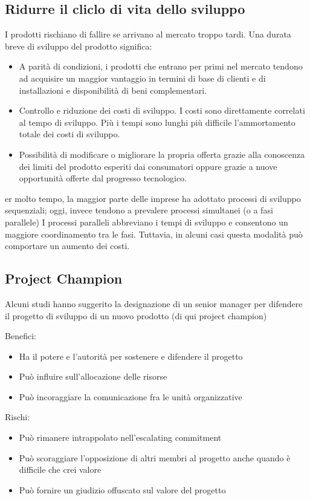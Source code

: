 \documentclass{article}
\begin{document}
\subsection{Ridurre il cliclo di vita dello sviluppo }
I prodotti rischiano di fallire se arrivano al mercato troppo tardi.
Una durata breve di sviluppo del prodotto significa:
\begin{itemize}
	\item A parità di condizioni, i prodotti che entrano per primi nel mercato
	tendono ad acquisire un maggior vantaggio in termini di base di clienti
	e di installazioni e disponibilità di beni complementari.
	\item Controllo e riduzione dei costi di sviluppo. I costi sono direttamente
	correlati al tempo di sviluppo. Più i tempi sono lunghi più difficile
	l’ammortamento totale dei costi di sviluppo.
	\item  Possibilità di modificare o migliorare la propria offerta grazie alla
	conoscenza dei limiti del prodotto esperiti dai consumatori oppure
	grazie a nuove opportunità offerte dal progresso tecnologico.
\end{itemize}

er molto tempo, la maggior
parte delle imprese ha
adottato processi di
sviluppo sequenziali;
oggi, invece tendono a
prevalere processi
simultanei (o a fasi
parallele)
I processi paralleli
abbreviano i tempi di
sviluppo e consentono un
maggiore coordinamento tra
le fasi. Tuttavia, in alcuni casi
questa modalità può
comportare un aumento dei
costi.

\subsection{Project Champion }
Alcuni studi hanno suggerito la designazione di un senior manager per
difendere il progetto di sviluppo di un nuovo prodotto (di qui project
champion)

Benefici:
\begin{itemize}
	\item Ha il potere e l’autorità per
	sostenere e difendere il progetto
	\item Può influire sull’allocazione delle
	risorse
	\item Può incoraggiare la
	comunicazione fra le unità
	organizzative
	
\end{itemize}

Rischi:
\begin{itemize}
	\item Può rimanere intrappolato
	nell’escalating commitment
	\item  Può scoraggiare l’opposizione di
	altri membri al progetto anche
	quando è difficile che crei valore
	\item  Può fornire un giudizio offuscato
	sul valore del progetto
\end{itemize}
\end{document}
